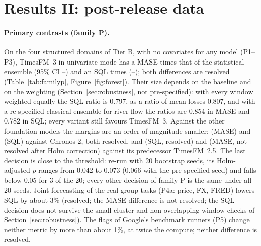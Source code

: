 \section{Results II: post-release data}
\label{sec:postrelease}



\paragraph{Primary contrasts (family P).} On the four structured domains of Tier B, with no covariates for any model (P1--P3), TimesFM~3 in
univariate mode has a MASE \PoneMase{} times that of the statistical ensemble (95\% CI \PoneMaseLo--\PoneMaseHi) and an SQL
\PoneSql{} times (\PoneSqlLo--\PoneSqlHi); both differences are resolved (Table~\ref{tab:familyp}, Figure~\ref{fig:forest}).
Their size depends on the baseline and on the weighting (Section~\ref{sec:robustness}, not pre-specified): with every window
weighted equally the SQL ratio is 0.797, as a ratio of mean losses 0.807, and with a re-specified classical ensemble for river flow
the ratios are 0.854 in MASE and 0.782 in SQL; every variant still favours TimesFM~3. Against
the other foundation models the margins are an order of magnitude smaller: \PtwoMase{} (MASE) and \PtwoSql{} (SQL) against
Chronos-2, both resolved, and \PthreeSql{} (SQL, resolved) and \PthreeMase{} (MASE, not resolved after Holm correction) against its
predecessor TimesFM~2.5. The last decision is close to the threshold: re-run with 20 bootstrap seeds, its Holm-adjusted $p$ ranges
from 0.042 to 0.073 (0.066 with the pre-specified seed) and falls below 0.05 for 3 of the 20; every other decision of family P is
the same under all 20 seeds. Joint forecasting of the real group tasks (P4a: price, FX, FRED) lowers SQL by about 3\% (resolved; the
MASE difference is not resolved; the SQL decision does not survive the small-cluster and non-overlapping-window checks of
Section~\ref{sec:robustness}). The flags of Google's benchmark runners (P5) change neither metric by more than about 1\%, at
twice the compute; neither difference is resolved.

\begin{table}[!htbp]
\centering
\caption{Family P (primary): contrasts on Tier B. P1--P3: same 3{,}855 series-windows, no covariates (on hourly data the context
lengths differ); P4a: 884 group-mode evaluations (no covariates); P5: the 3{,}855 series-windows, both configurations with the
covariates of load and river flow. Ratio of errors, A / B ($<1$: A better), with the
two-way cluster bootstrap interval and the series-only interval; decisions by Holm-adjusted $p$ over the ten tests.}
\label{tab:familyp}
\scriptsize
\setlength{\tabcolsep}{4pt}

\end{table}

